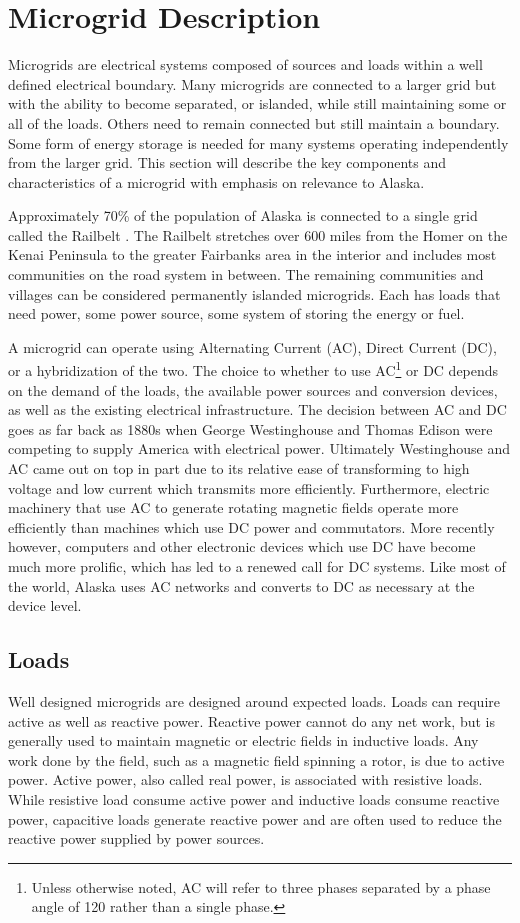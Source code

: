 \section{Microgrid Description}
Microgrids are electrical systems composed of sources and loads within a well defined electrical boundary. Many microgrids are connected to a larger grid but with the ability to become separated, or islanded, while still maintaining some or all of the loads. Others need to remain connected but still maintain a boundary. Some form of energy storage is needed for many systems operating independently from the larger grid. This section will describe the key components and characteristics of a microgrid with emphasis on relevance to Alaska.

Approximately 70\% of the population of Alaska is connected to a single grid called the Railbelt \cite{railbelt}. The Railbelt stretches over 600 miles from the Homer on the Kenai Peninsula to the greater Fairbanks area in the interior and includes most communities on the road system in between. The remaining communities and villages can be considered permanently islanded microgrids. Each has loads that need power, some power source, some system of storing the energy or fuel.

A microgrid can operate using Alternating Current (AC), Direct Current (DC), or a hybridization of the two. The choice to whether to use AC\footnote{Unless otherwise noted, AC will refer to three phases separated by a phase angle of 120\textdegree{} rather than a single phase.} or DC depends on the demand of the loads, the available power sources and conversion devices, as well as the existing electrical infrastructure. The decision between AC and DC goes as far back as 1880s when George Westinghouse and Thomas Edison were competing to supply America with electrical power. Ultimately Westinghouse and AC came out on top in part due to its relative ease of transforming to high voltage and low current which transmits more efficiently. Furthermore, electric machinery that use AC to generate rotating magnetic fields operate more efficiently than machines which use DC power and commutators. More recently however, computers and other electronic devices which use DC have become much more prolific, which has led to a renewed call for DC systems. Like most of the world, Alaska uses AC networks and converts to DC as necessary at the device level.

\subsection{Loads}
Well designed microgrids are designed around expected loads. Loads can require active as well as reactive power. Reactive power cannot do any net work, but is generally used to maintain magnetic or electric fields in inductive loads. Any work done by the field, such as a magnetic field spinning a rotor, is due to active power. Active power, also called real power, is associated with resistive loads. While resistive load consume active power and inductive loads consume reactive power, capacitive loads generate reactive power and are often used to reduce the reactive power supplied by power sources. 

